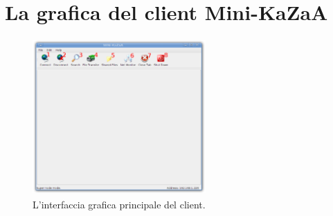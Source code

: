 \section{La grafica del client Mini-KaZaA}\label{sec:grafica}
\begin{figure}[t]
 \centering
 \includegraphics[width=250px,height=225px,bb=14 14 841 737]{images/mini_kazaa_client.eps}
 \caption{L'interfaccia grafica principale del client.}
 \label{fig:mini_kazaa_client}
\end{figure}

